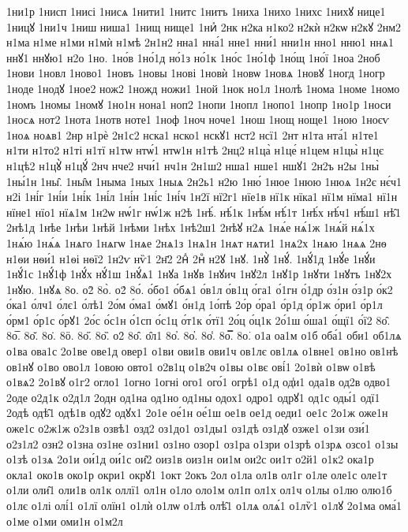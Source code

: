 {1ни1р
1нисп
1нисі
1нисѧ
1нити1
1нитс
1нитъ
1ниха
1нихо
1нихс
1нихꙋ
нице1
1ницꙋ
1ни1ч
1ниш
ниша1
1нищ
нище1
1ниⷯ
2нк
н2ка
н1ко2
н2кѝ
н2кѡ
н2кꙋ
2нм2
н1ма
н1ме
н1ми
н1мѝ
н1мѣ
2н1н2
нна1
нна́1
нне1
нни́1
нни1н
нно1
нню1
ннѧ1
ннꙋ1
ннꙋю1
н2о
1но.
1но́в
1но́1д
но́1з
но́1к
1но́с
1но́1ф
1но́щ
1но́ї
1ноа
2ноб
1нови
1новл
1ново1
1новъ
1новы
1нові
1новѝ
1новѡ
1новѧ
1новꙋ
1ногд
1ногр
1ноде
1нодꙋ
1ное2
нож2
1ножд
ножи1
1ной
1нок
но1л
1нолѣ
1нома
1номе
1номо
1номъ
1номы
1номꙋ
1но1н
нона1
ноп2
1нопи
1нопл
1нопо1
1нопр
1но1р
1носи
1носѧ
нот2
1нота
1нотв
ноте1
1ноф
1ноч
ноче1
1нош
1нощ
ноще1
1ною
1ноєѵ
1ноѧ
ноѧв1
2нр
н1рѐ
2н1с2
нска1
нско1
нскꙋ1
нст2
нсї1
2нт
н1та
нта́1
н1те1
н1ти
н1то2
н1ті
н1тї
н1тѡ
нтѡ́1
нтѡ1н
н1тѣ
2нц2
н1ца̀
н1це́
н1цем
н1цы̀
н1цє
н1цѣ2
н1цꙋ̀
н1цꙋ́
2нч
нче2
нчи́1
нч1н
2н1ш2
нша1
нше1
ншꙋ1
2н2ъ
н2ы
1ны̀
1ны́1н
1ны̑.
1ны̑м
1ныма
1ных
1ныѧ
2н2ь1
н2ю
1ню́
1нюе
1нюю
1нюѧ
1н2є
нє́ч1
н2і
1ні́г
1ні́и
1ні́к
1ні́л
1ні́н
1ні́с
1ні́ч
1н2ї
нї2г1
нїе1в
нї1к
нїка1
нї1м
нїма1
нї1н
нїне1
нїо1
нїѧ1м
1н2ѡ
нѡ́1г
нѡ́1ж
н2ѣ
1нѣ́.
нѣ́1к
1нѣ́м
нѣ́1т
1нѣ́х
нѣ́ч1
нѣ́ш1
нѣ̑1
2нѣ1д
1нѣе
1нѣи
1нѣй
1нѣми
1нѣх
1нѣ2ш1
2нѣꙋ
н2ѧ
1нѧ́е
нѧ́1ж
1нѧ́й
нѧ́1х
1нѧ́ю
1нѧ́ѧ
1нѧго
1нѧгѡ
1нѧе
2нѧ1з
1нѧ1н
1нѧт
нѧти1
1нѧ2х
1нѧю
1нѧѧ
2нѳ
н1ѳи
нѳи́1
н1ѳі
нѳї2
1н2ѵ
нѷ1
2н҃2
2нⷣ
2нⷴ
н2ꙋ
1нꙋ.
1нꙋ̀
1нꙋ́.
1нꙋ́1д
1нꙋ́е
1нꙋ́и
1нꙋ́1с
1нꙋ́1ф
1нꙋ́х
нꙋ́1ш
1нꙋ́ѧ1
1нꙋа
1нꙋв
1нꙋич
1нꙋ2л
1нꙋ1р
1нꙋти
1нꙋтъ
1нꙋ2х
1нꙋю.
1нꙋѧ
8о.
о2̀
8о̀.
о2́
8о́.
о́бо1
о́бѧ1
о́в1л
о́в1ц
о́га1
о́1гн
о́1др
о́з1н
о́з1р
о́к2
о́ка1
о́лч1
о́лє1
о́лѣ1
2о́м
о́ма1
о́мꙋ1
о́н1д
1о́пѣ
2о́р
о́ра1
о́р1д
о́р1ж
о́ри1
о́р1л
о́рм1
о́р1с
о́рꙋ1
2о́с
о́с1н
о́1сп
о́с1ц
о́т1к
о́тї1
2о́ц
о́ц1к
2о́1ш
о́ша1
о́щї1
о́ї2
8о̂.
8о̅.
8о̆.
8о̇.
8ӧ.
8о̋.
8о̏.
о2̑
8о̑.
о̑л1
8о̓.
8о̔.
8о̾.
8о̿.
8о͘.
о1а
оа1м
о1б
оба́1
оби1
об1лѧ
о1ва
ова1с
2о1ве
ове1д
овер1
о1ви
ови1в
ови1ч
ов1лє
ов1лѧ
о1вне1
ов1но
ов1нѣ
ов1нꙋ
о1во
ово1л
1овою
овто1
о2в1ц
о1в2ч
о1вы
о1вє
ові́1
2о1вѝ
о1вѡ
о1вѣ
о1вѧ2
2о1вꙋ
о1г2
огло1
1огно
1огні
ого1
ого́1
огрѣ1
о1д
од̾и1
ода1в
од2в
одво1
2оде
о2д1к
о2д1л
2одн
од1на
од1но
од1ны
одох1
одро1
одрꙋ1
од1с
оды́1
одї1
2одѣ
одѣ̑1
одѣ1в
одꙋ2
одꙋх1
2о1е
ое́1н
ое́1ш
ое1в
ое1д
оеди1
ое1с
2о1ж
оже1н
оже1с
о2ж1ж
о2з1в
озвѣ1
озд2
оз1до1
оз1ды1
оз1дѣ
оз1дꙋ
озже1
о1зи
ози́1
о2з1л2
озн2
о1зна
оз1не
оз1ни1
оз1но
озор1
оз1ра
о1зри
о1зрѣ
о1зрѧ
озсо1
о1зы
о1зѣ
о1зѧ
2о1и
ои́1д
ои́1с
ои̑2
оиз1в
оиз1н
ои1м
ои2с
ои1т
о2й1
о1к2
ока1р
окла1
око1в
око1р
окри1
окрꙋ1
1окт
2окъ
2ол
о1ла
ол1в
ол1г
о1ле
оле1с
оле1т
о1ли
оли̑1
оли1в
ол1к
оллї1
ол1н
о1ло
оло1м
ол1п
ол1х
ол1ч
о1лы
о1лю
олю1б
о1лє
о1лі
олі́1
о1лї
олїн1
о1лѝ
о1лѡ
о1лѣ
олѣ̑1
о1лѧ
олѧ́1
о1лѷ1
о1лꙋ
2о1ма
ома́1
о1ме
о1ми
оми1н
о1м2л
}
